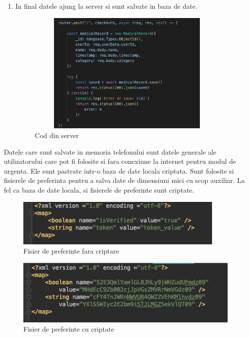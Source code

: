 \documentclass[12pt]{article}
\begin{document}
\begin{enumerate}
    \item In final datele ajung la server si sunt salvate in baza de date.
    

    \begin{figure}[H]
        \centering
        \includegraphics[width=10cm, height=6cm]{addServer.png}
        \caption{Cod din server}
        \end{figure}

\end{enumerate}

Datele care sunt salvate in memoria telefonului sunt datele generale ale utilizatorului care pot fi folosite
si fara conexiune la internet pentru modul de urgenta. Ele sunt pastrate intr-o baza de date locala criptata.
Sunt folosite si fisierele de preferinta pentru a salva date de dimensiuni mici 
cu scop auxiliar. La fel ca baza de date locala, si fisierele de preferinte sunt criptate.

\bigskip

\begin{figure}[H]
    \centering
    \includegraphics{noncript.png}
    \caption{Fisier de preferinte fara criptare}
    \end{figure}

    \begin{figure}[H]
        \centering
        \includegraphics{cript2.png}
        \caption{Fisier de preferinte cu criptate}
        \end{figure}
\end{document}
